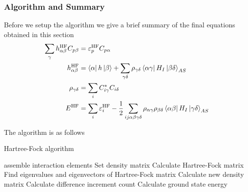     \subsubsection{Algorithm and Summary}
        Before we setup the algorithm we give a brief summary of the final
        equations obtained in this section
            \begin{equation}
                \begin{aligned}
                    \sum_{\gamma} h^{\text{HF}}_{\alpha\beta}C_{p\beta} &=
                    \varepsilon^{\text{HF}}_pC_{p\alpha} \\
                    h^{\text{HF}}_{\alpha\beta} &= \bra{\alpha}h\ket{\beta} +
                    \sum_{\gamma\delta} \rho_{\gamma\delta}
                    \bra{\alpha\gamma}H_I\ket{\beta\delta}_{AS} \\
                    \rho_{\gamma\delta} &= \sum_i C^{*}_{i\gamma}C_{i\delta} \\
                    E^{\text{HF}} &= \sum_{i} \varepsilon^{\text{HF}}_i -
                    \frac{1}{2}\sum_{ij\alpha\beta\gamma\delta}
                    \rho_{\alpha\gamma}\rho_{\beta\delta}
                    \bra{\alpha\beta}H_I\ket{\gamma\delta}_{AS}
                \end{aligned}
                \label{eq:HFsummary}
            \end{equation}
        
        The algorithm is as follows
            \begin{algorithm}[H]
            \caption{Hartree-Fock algorithm}\label{alg:hartreeFock}
            \begin{algorithmic}[1]
                \State assemble interaction elements
                \State Set density matrix 
                    \State Calculate Hartree-Fock matrix 
                    \State Find eigenvalues and eigenvectors of Hartree-Fock matrix
                    \State Calculate new density matrix
                    \State Calculate difference 
                    \State increment count
                \EndWhile
                \State Calculate ground state energy 
            \end{algorithmic}
            \end{algorithm}

